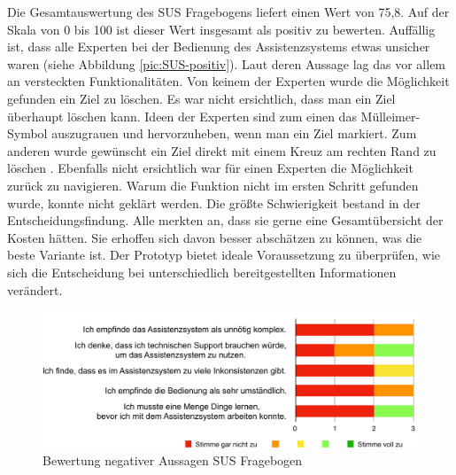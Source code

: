 Die Gesamtauswertung des SUS Fragebogens liefert einen Wert von 75,8. Auf der Skala von 0 bis 100 ist dieser Wert insgesamt als positiv zu bewerten.  Auffällig ist, dass alle Experten bei der Bedienung des Assistenzsystems etwas unsicher waren (siehe Abbildung \ref{pic:SUS-positiv}). Laut deren Aussage lag das vor allem an versteckten Funktionalitäten. Von keinem der Experten wurde die Möglichkeit gefunden ein Ziel zu löschen. Es war nicht ersichtlich, dass man ein Ziel überhaupt löschen kann. Ideen der Experten sind zum einen das Mülleimer-Symbol auszugrauen und hervorzuheben, wenn man ein Ziel markiert. Zum anderen wurde gewünscht ein Ziel direkt mit einem Kreuz am rechten Rand zu löschen . Ebenfalls nicht ersichtlich war für einen Experten die Möglichkeit zurück zu navigieren. Warum die Funktion nicht im ersten Schritt gefunden wurde, konnte nicht geklärt werden. Die größte Schwierigkeit bestand in der Entscheidungsfindung. Alle merkten an, dass sie gerne eine Gesamtübersicht der Kosten hätten. Sie erhoffen sich davon besser abschätzen zu können, was die beste Variante ist. Der Prototyp bietet ideale Voraussetzung zu überprüfen, wie sich die Entscheidung bei unterschiedlich bereitgestellten Informationen verändert.
\begin{figure}[htb]
\centering
\includegraphics[scale=0.65]{DA_files/Bilder/Validierung/Bild-negative_Aussagen.pdf}
\caption{Bewertung negativer Aussagen SUS Fragebogen}
\label{pic:SUS-negativ}
\end{figure}

